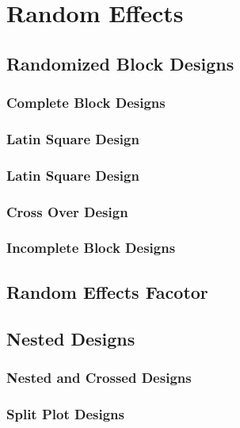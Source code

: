 \section{Random Effects}

\subsection{Randomized Block Designs}

\subsubsection{Complete Block Designs}


\subsubsection{Latin Square Design}

\subsubsection{Latin Square Design}

\subsubsection{Cross Over Design}

\subsubsection{Incomplete Block Designs}


\subsection{Random Effects Facotor}

\subsection{Nested Designs}


\subsubsection{Nested and Crossed Designs}

\subsubsection{Split Plot Designs}




